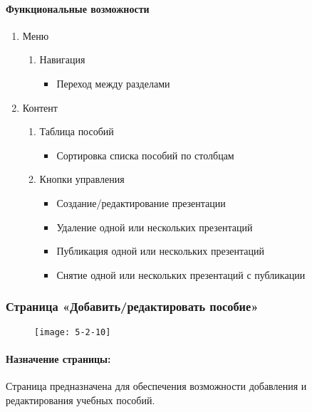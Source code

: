 \paragraph{Функциональные возможности}
\begin{enumerate}
	\item Меню
	\begin{enumerate}
		\item Навигация
		\begin{itemize}
			\item Переход между разделами
		\end{itemize}
	\end{enumerate}

	\item Контент
	\begin{enumerate}
		\item Таблица пособий
		\begin{itemize}
			\item Сортировка списка пособий по столбцам
		\end{itemize}

		\item Кнопки управления
		\begin{itemize}
			\item Создание/редактирование презентации
			\item Удаление одной или нескольких презентаций
			\item Публикация одной или нескольких презентаций
			\item Снятие одной или нескольких презентаций с публикации
		\end{itemize}
	\end{enumerate}
\end{enumerate}


\subsubsection{Страница «Добавить/редактировать пособие»}
\begin{figure}[H]
	\texttt{[image: 5-2-10]}
\end{figure}
\paragraph{Назначение страницы:} Страница предназначена для обеспечения возможности добавления и редактирования учебных пособий.

